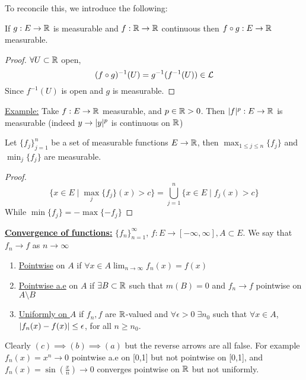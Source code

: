 To reconcile this, we introduce the following:
\begin{prop}
    If $g: E \rightarrow \mathbb{R}$ is measurable and $f: \mathbb{R} \rightarrow \mathbb{R}$ continuous then $f \circ g: E \rightarrow \mathbb{R}$ measurable.
\end{prop}

\begin{proof}
    $\forall U \subset \mathbb{R} $ open,
    \[
        (f \circ g)^{-1}(U) = g^{-1}(f^{-1}(U)) \in \mathcal{L}
    \]
    Since $f^{-1}(U)$ is open and $g$ is measurable.
\end{proof}

\underline{Example:} Take $f: E \rightarrow \mathbb{R}$ measurable, and $p \in \mathbb{R} > 0$.
Then $\lvert f\rvert^p: E \rightarrow \mathbb{R}$ is measurable (indeed $y \rightarrow \lvert y\rvert^p$ is continuous on $\mathbb{R}$)

\begin{prop}
    Let $\{ f_j \}_{j=1}^{n}$ be a set of measurable functions $E \rightarrow \mathbb{R}$, then $\max_{1 \leq j \leq n} \{ f_j \}$ and $\min_{j} \{ f_j \}$ are measurable.
\end{prop}
\begin{proof}
    \[
        \{ x \in E \mid \max_{j} \{ f_j \} (x) > c \} = \bigcup_{j=1}^{n} \{ x \in E \mid f_j (x) > c \}
    \]
    While $\min \{f_j \} = - \max \{ -f_j \}$
\end{proof}

\textbf{\underline{Convergence of functions:}} $\{ f_n \}_{n=1}^{\infty}$, $f: E \rightarrow [-\infty, \infty], A \subset E$.
We say that $f_n \rightarrow f$ as $n \rightarrow \infty$
\begin{enumerate}
    \item \underline{Pointwise} on $A$ if $\forall x \in A \lim_{n \rightarrow \infty} f_n (x) = f(x)$
    \item \underline{Pointwise a.e} on $A$ if $\exists B \subset \mathbb{R}$ such that $m(B) = 0$ and $f_n \rightarrow f$ pointwise on $A \setminus B$
    \item \underline{Uniformly on $A$} if $f_n, f$ are $\mathbb{R}$-valued and $\forall \epsilon > 0 \; \exists n_0$ such that $\forall x \in A$, $\lvert f_n(x) - f(x)\rvert \leq \epsilon$, for all $n \geq n_0$.
\end{enumerate}

Clearly $(c) \implies (b) \implies (a)$ but the reverse arrows are all false.
For example $f_n (x) = x^n \rightarrow 0$ pointwise a.e on [0,1] but not pointwise on [0,1], and $f_n (x) = \sin(\frac{x}{n}) \rightarrow 0$ converges pointwise on $\mathbb{R}$ but not uniformly.


